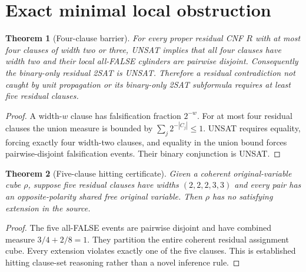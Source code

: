 \documentclass{article}
\newtheorem{theorem}{Theorem}
\begin{document}
\section{Exact minimal local obstruction}
\begin{theorem}[Four-clause barrier]
For every proper residual CNF $R$ with at most four clauses of width two or three, UNSAT implies that all four clauses have width two and their local all-FALSE cylinders are pairwise disjoint. Consequently the binary-only residual 2SAT is UNSAT. Therefore a residual contradiction not caught by unit propagation or its binary-only 2SAT subformula requires at least five residual clauses.
\end{theorem}
\begin{proof}
A width-$w$ clause has falsification fraction $2^{-w}$. For at most four residual clauses the union measure is bounded by $\sum_j2^{-|C_j|}\le1$. UNSAT requires equality, forcing exactly four width-two clauses, and equality in the union bound forces pairwise-disjoint falsification events. Their binary conjunction is UNSAT.
\end{proof}
\begin{theorem}[Five-clause hitting certificate]
Given a coherent original-variable cube $\rho$, suppose five residual clauses have widths $(2,2,2,3,3)$ and every pair has an opposite-polarity shared free original variable. Then $\rho$ has no satisfying extension in the source.
\end{theorem}
\begin{proof}
The five all-FALSE events are pairwise disjoint and have combined measure $3/4+2/8=1$. They partition the entire coherent residual assignment cube. Every extension violates exactly one of the five clauses. This is established hitting clause-set reasoning rather than a novel inference rule.
\end{proof}
\end{document}
